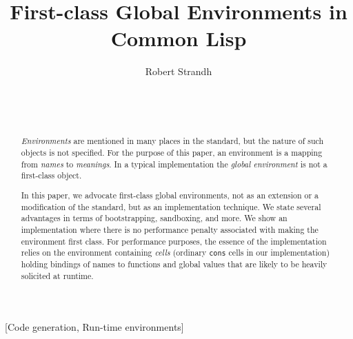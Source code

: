 \documentclass{acm_proc_article-sp}
\def\inputtex#1{}
\begin{document}
\title{First-class Global Environments in Common Lisp}
\author{\alignauthor
Robert Strandh\\
\\
\\
\\
}


\maketitle

\begin{abstract}
\emph{Environments} are mentioned in many places in
the \commonlisp{} standard, but the nature of such objects is not
specified.  For the purpose of this paper, an environment is a mapping
from \emph{names} to \emph{meanings}.  In a typical \commonlisp{}
implementation the \emph{global environment} is not a first-class
object.

In this paper, we advocate first-class global environments,
not as an extension or a modification of the \commonlisp{} standard,
but as an implementation technique.  We state several advantages in
terms of bootstrapping, sandboxing, and more.  We show an
implementation where there is no performance penalty associated with
making the environment first class.  For performance purposes, the
essence of the implementation relies on the environment containing
\emph{cells} (ordinary \texttt{cons} cells in our implementation)
holding bindings of names to functions and global values that are
likely to be heavily solicited at runtime.
\end{abstract}

[Code generation, Run-time environments]



\inputtex{spec-macros.tex}

\inputtex{sec-introduction.tex}
\inputtex{sec-previous.tex}
\inputtex{sec-our-method.tex}
\inputtex{sec-benefits.tex}
\inputtex{sec-conclusions.tex}
\inputtex{sec-acknowledgments.tex}
\inputtex{app-protocol.tex}



\end{document}
